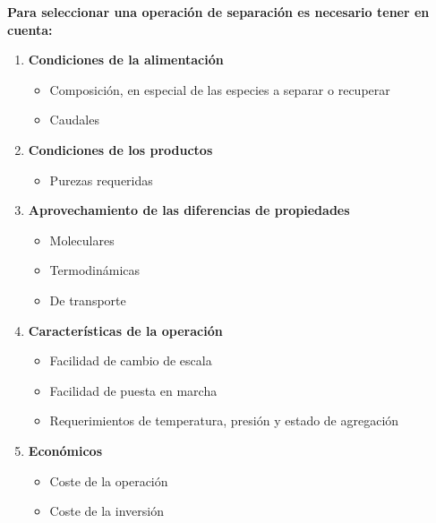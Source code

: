 \documentclass{report}
\begin{document}
\noindent\textbf{Para seleccionar una operación de separación es necesario tener en cuenta:}
\begin{enumerate}
    \item\label{n:1} \textbf{Condiciones de la alimentación}
    \begin{itemize}[label=-]
        \item Composición, en especial de las especies a separar o recuperar
        \item Caudales 
    \end{itemize}

    \item\label{n:2} \textbf{Condiciones de los productos}
    \begin{itemize}[label=-]
        \item Purezas requeridas
    \end{itemize}

    \item\label{n:3} \textbf{Aprovechamiento de las diferencias de propiedades}
    \begin{itemize}[label=-]
        \item Moleculares
        \item Termodinámicas
        \item De transporte
    \end{itemize}

    \item\label{n:4} \textbf{Características de la operación}
    \begin{itemize}[label=-]
        \item Facilidad de cambio de escala
        \item Facilidad de puesta en marcha
        \item Requerimientos de temperatura, presión y estado de agregación
    \end{itemize}

    \item\label{n:5} \textbf{Económicos}
    \begin{itemize}[label=-]
        \item Coste de la operación
        \item Coste de la inversión
    \end{itemize}
\end{enumerate}
\end{document}
